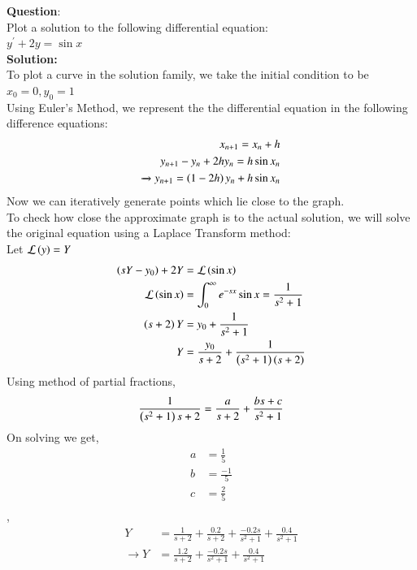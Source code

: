 \documentclass[journal]{IEEEtran}
\begin{document}
\textbf{Question}:\\
Plot a solution to the following differential equation:\\
    $y^\prime + 2y = \sin x$
\\
\textbf{Solution: }\\
To plot a curve in the solution family, we take the initial condition to be\\
$x_0 = 0, y_0 = 1$\\
Using Euler's Method, we represent the the differential equation in the following difference equations:
\begin{align}
    x_{n+1} = x_n + h\\
    y_{n+1} - y_n + 2hy_n  = h\sin x_n\\
    \xrightarrow{} y_{n+1} = \left(1-2h\right)y_n + h\sin x_n
\end{align}
Now we can iteratively generate points which lie close to the graph.\\
To check how close the approximate graph is to the actual solution, we will solve the original 
equation using a Laplace Transform method:\\
Let $\mathcal{L}\left(y\right) = Y$\\
\begin{align}
    \left(sY - y_0\right) +2Y &= \mathcal{L}\left(\sin x\right)\\
    \mathcal{L}\left(\sin x\right) &= \int_{0}^{\infty} e^{-sx}\sin x = \frac{1}{s^2 + 1}\\
    \left(s + 2\right)Y &= y_0 + \frac{1}{s^2 + 1}\\
    Y &= \frac{y_0}{s + 2} + \frac{1}{\left(s^2+1\right)\left(s+2\right)}\\
\end{align}
    Using method of partial fractions,
    \begin{align}   
        \frac{1}{\left(s^2+1\right){s+2}} = \frac{a}{s+2} + \frac{bs + c}{s^2+1}\\
    \end{align}
    On solving we get,
    \begin{align}
        a &= \frac{1}{5}\\
        b &= \frac{-1}{5}\\
        c &= \frac{2}{5}\\
    \end{align}
    ,\\
\begin{align}
    Y &= \frac{1}{s + 2} + \frac{0.2}{s+2} + \frac{-0.2s}{s^2 + 1} + \frac{0.4}{s^2 + 1}\\
    \xrightarrow{} Y &=  \frac{1.2}{s + 2} + \frac{-0.2s}{s^2 + 1} + \frac{0.4}{s^2 + 1}\\
\end{align}
\end{document}
